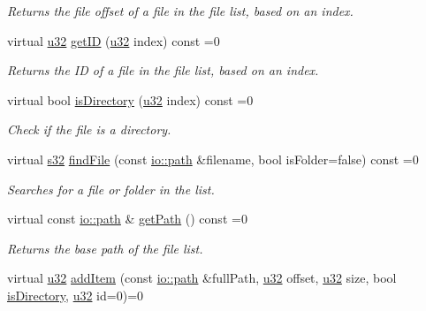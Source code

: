 \begin{DoxyCompactItemize}
\begin{DoxyCompactList}\small\item\em Returns the file offset of a file in the file list, based on an index. \end{DoxyCompactList}\item 
virtual \hyperlink{namespaceirr_a0416a53257075833e7002efd0a18e804}{u32} \hyperlink{classirr_1_1io_1_1IFileList_a9f633344aa2bb36f619d1ca8472b46b6}{get\+ID} (\hyperlink{namespaceirr_a0416a53257075833e7002efd0a18e804}{u32} index) const =0
\begin{DoxyCompactList}\small\item\em Returns the ID of a file in the file list, based on an index. \end{DoxyCompactList}\item 
virtual bool \hyperlink{classirr_1_1io_1_1IFileList_a0f2cb8c99e9ecc4b56d08718c885a5af}{is\+Directory} (\hyperlink{namespaceirr_a0416a53257075833e7002efd0a18e804}{u32} index) const =0
\begin{DoxyCompactList}\small\item\em Check if the file is a directory. \end{DoxyCompactList}\item 
virtual \hyperlink{namespaceirr_ac66849b7a6ed16e30ebede579f9b47c6}{s32} \hyperlink{classirr_1_1io_1_1IFileList_a2b0fce45cbea72f5c6dc13eb85183054}{find\+File} (const \hyperlink{namespaceirr_1_1io_a6468281622ce3a1c46b72e19f32dded5}{io\+::path} \&filename, bool is\+Folder=false) const =0
\begin{DoxyCompactList}\small\item\em Searches for a file or folder in the list. \end{DoxyCompactList}\item 
\mbox{\label{classirr_1_1io_1_1IFileList_ac3473e66ba9c3cee2e06c1fb46493e88}} 
virtual const \hyperlink{namespaceirr_1_1io_a6468281622ce3a1c46b72e19f32dded5}{io\+::path} \& \hyperlink{classirr_1_1io_1_1IFileList_ac3473e66ba9c3cee2e06c1fb46493e88}{get\+Path} () const =0
\begin{DoxyCompactList}\small\item\em Returns the base path of the file list. \end{DoxyCompactList}\item 
virtual \hyperlink{namespaceirr_a0416a53257075833e7002efd0a18e804}{u32} \hyperlink{classirr_1_1io_1_1IFileList_ad0d90f1bb8a35910f4f877268e2f043e}{add\+Item} (const \hyperlink{namespaceirr_1_1io_a6468281622ce3a1c46b72e19f32dded5}{io\+::path} \&full\+Path, \hyperlink{namespaceirr_a0416a53257075833e7002efd0a18e804}{u32} offset, \hyperlink{namespaceirr_a0416a53257075833e7002efd0a18e804}{u32} size, bool \hyperlink{classirr_1_1io_1_1IFileList_a0f2cb8c99e9ecc4b56d08718c885a5af}{is\+Directory}, \hyperlink{namespaceirr_a0416a53257075833e7002efd0a18e804}{u32} id=0)=0

\end{DoxyCompactItemize}
